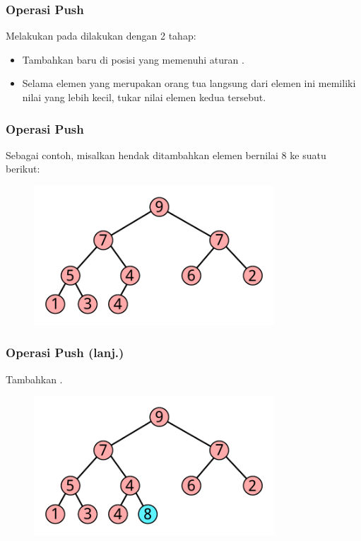 \begin{frame}
\frametitle{Operasi Push}
Melakukan  pada \pbinaryHeap dilakukan dengan 2 tahap:
\begin{itemize}
  \item Tambahkan \fnode baru di posisi yang memenuhi aturan .
  \item Selama elemen \fnode yang merupakan orang tua langsung dari elemen ini memiliki nilai yang lebih kecil, tukar nilai elemen kedua \fnode tersebut.
\end{itemize}
\end{frame}

\begin{frame}
\frametitle{Operasi Push}
Sebagai contoh, misalkan hendak ditambahkan elemen bernilai 8 ke suatu \pbinaryHeap berikut:
\begin{figure}
  \includegraphics[width=9cm]{asset/heap.pdf}
\end{figure}
\end{frame}

\begin{frame}
\frametitle{Operasi Push (lanj.)}
Tambahkan \fnode.
\begin{figure}
  \includegraphics[width=9cm]{asset/push-1.pdf}
\end{figure}
\end{frame}

